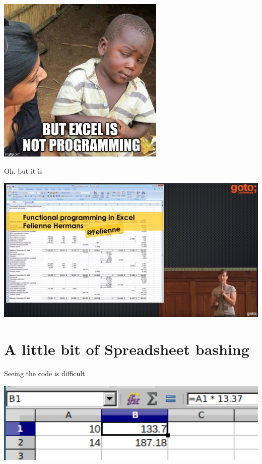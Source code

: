 \documentclass[aspectratio=169,notes]{beamer}
\begin{document}
	\begin{frame}[fragile]
		\begin{center}
		\includegraphics[width=0.6\textwidth]{skeptical2.png}
		\end{center}
	\end{frame}

	\begin{frame}[fragile]{Oh, but it is \hfill{} \cite{GOTO201638:online}}
		\begin{center}
		\includegraphics[width=1.0\textwidth]{functionalexcel.jpg}
		\end{center}
	\end{frame}

	\section{A little bit of Spreadsheet bashing}
	\begin{frame}[fragile]{Seeing the code is difficult}
		\begin{center}
		\includegraphics[width=1.0\textwidth]{excelseeingcode.jpg}
		\end{center}
	\end{frame}
\end{document}
